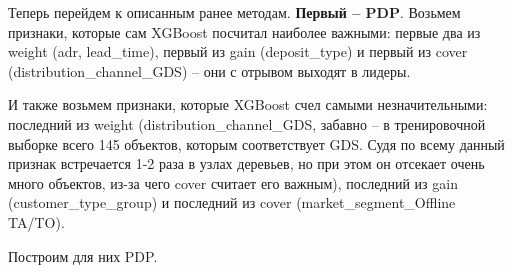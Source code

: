 Теперь перейдем к описанным ранее методам. \textbf{Первый -- PDP}. Возьмем признаки, которые сам XGBoost посчитал наиболее важными: первые два из weight (adr, lead\_time), первый из gain (deposit\_type) и первый из cover (distribution\_channel\_GDS) -- они с отрывом выходят в лидеры.

И также возьмем признаки, которые XGBoost счел самыми незначительными: последний из weight (distribution\_channel\_GDS, забавно -- в тренировочной выборке всего 145 объектов, которым соответствует GDS. Судя по всему данный признак встречается 1-2 раза в узлах деревьев, но при этом он отсекает очень много объектов, из-за чего cover считает его важным), последний из gain (customer\_type\_group) и последний из cover (market\_segment\_Offline TA/TO).

Построим для них PDP.

